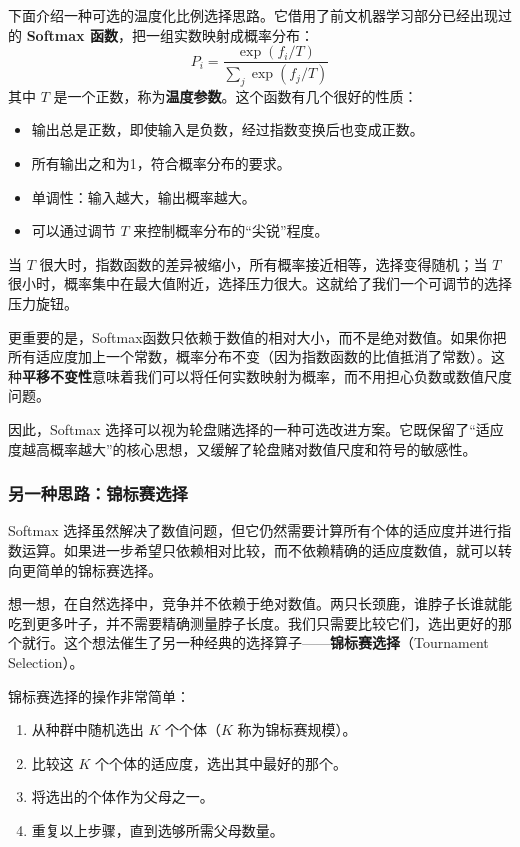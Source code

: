 \documentclass[lang=cn,zihao=-4,a4paper,fontset=windows]{beautybook}
\begin{document}
下面介绍一种可选的温度化比例选择思路。它借用了前文机器学习部分已经出现过的 \textbf{Softmax 函数}，把一组实数映射成概率分布：
\[
P_i = \frac{\exp(f_i / T)}{\sum_j \exp(f_j / T)}
\]
其中 \(T\) 是一个正数，称为\textbf{温度参数}。这个函数有几个很好的性质：
\begin{itemize}
    \item 输出总是正数，即使输入是负数，经过指数变换后也变成正数。
    \item 所有输出之和为1，符合概率分布的要求。
    \item 单调性：输入越大，输出概率越大。
    \item 可以通过调节 \(T\) 来控制概率分布的“尖锐”程度。
\end{itemize}

当 \(T\) 很大时，指数函数的差异被缩小，所有概率接近相等，选择变得随机；当 \(T\) 很小时，概率集中在最大值附近，选择压力很大。这就给了我们一个可调节的选择压力旋钮。

更重要的是，Softmax函数只依赖于数值的相对大小，而不是绝对数值。如果你把所有适应度加上一个常数，概率分布不变（因为指数函数的比值抵消了常数）。这种\textbf{平移不变性}意味着我们可以将任何实数映射为概率，而不用担心负数或数值尺度问题。

因此，Softmax 选择可以视为轮盘赌选择的一种可选改进方案。它既保留了“适应度越高概率越大”的核心思想，又缓解了轮盘赌对数值尺度和符号的敏感性。

\subsubsection{另一种思路：锦标赛选择}

Softmax 选择虽然解决了数值问题，但它仍然需要计算所有个体的适应度并进行指数运算。如果进一步希望只依赖相对比较，而不依赖精确的适应度数值，就可以转向更简单的锦标赛选择。

想一想，在自然选择中，竞争并不依赖于绝对数值。两只长颈鹿，谁脖子长谁就能吃到更多叶子，并不需要精确测量脖子长度。我们只需要比较它们，选出更好的那个就行。这个想法催生了另一种经典的选择算子——\textbf{锦标赛选择}（Tournament Selection）。

锦标赛选择的操作非常简单：
\begin{enumerate}
    \item 从种群中随机选出 \(K\) 个个体（\(K\) 称为锦标赛规模）。
    \item 比较这 \(K\) 个个体的适应度，选出其中最好的那个。
    \item 将选出的个体作为父母之一。
    \item 重复以上步骤，直到选够所需父母数量。
\end{enumerate}
\end{document}
